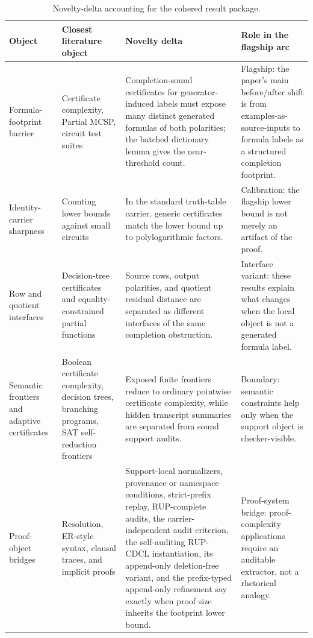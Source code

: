 \documentclass[11pt]{article}
\theoremstyle{definition}
\begin{document}
\begin{table}[htbp]
\centering
\small
\begin{tabularx}{\textwidth}{@{}p{}p{}p{}X@{}}
\toprule
Object & Closest literature object & Novelty delta & Role in the flagship arc \\
\midrule
Formula-footprint barrier & Certificate complexity, Partial MCSP, circuit test suites & Completion-sound certificates for generator-induced labels must expose many distinct generated formulas of both polarities; the batched dictionary lemma gives the near-threshold count. & Flagship: the paper's main before/after shift is from examples-as-source-inputs to formula labels as a structured completion footprint. \\
Identity-carrier sharpness & Counting lower bounds against small circuits & In the standard truth-table carrier, generic certificates match the lower bound up to polylogarithmic factors. & Calibration: the flagship lower bound is not merely an artifact of the proof. \\
Row and quotient interfaces & Decision-tree certificates and equality-constrained partial functions & Source rows, output polarities, and quotient residual distance are separated as different interfaces of the same completion obstruction. & Interface variant: these results explain what changes when the local object is not a generated formula label. \\
Semantic frontiers and adaptive certificates & Boolean certificate complexity, decision trees, branching programs, SAT self-reduction frontiers & Exposed finite frontiers reduce to ordinary pointwise certificate complexity, while hidden transcript summaries are separated from sound support audits. & Boundary: semantic constraints help only when the support object is checker-visible. \\
Proof-object bridges & Resolution, ER-style syntax, clausal traces, and implicit proofs & Support-local normalizers, provenance or namespace conditions, strict-prefix replay, RUP-complete audits, the carrier-independent audit criterion, the self-auditing RUP-CDCL instantiation, its append-only deletion-free variant, and the prefix-typed append-only refinement say exactly when proof size inherits the footprint lower bound. & Proof-system bridge: proof-complexity applications require an auditable extractor, not a rhetorical analogy. \\
\bottomrule
\end{tabularx}
\caption{Novelty-delta accounting for the cohered result package.}
\label{tab:novelty-delta-accounting}
\end{table}
\end{document}
